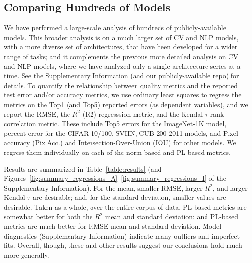 \subsection{Comparing Hundreds of Models}
\label{sxn:all_cv_models}


We have performed a large-scale analysis of hundreds of publicly-available models.
This broader analysis is on a much larger set of CV and NLP models, with a more diverse set of architectures, that have been developed for a wider range of tasks; and it complements the previous more detailed analysis on CV and NLP models, where we have analyzed only a single architecture series at a time.
See the Supplementary Information
(and our publicly-available repo)
for details.
To quantify the relationship between quality metrics and the reported test error and/or accuracy metrics, we use ordinary least squares 
to regress the metrics on the Top1 (and Top5) reported errors (as dependent variables), and we report the RMSE, the $R^2$ (R2) regresssion metric, and the Kendal-$\tau$ rank correlation metric.
These include Top5 errors for the ImageNet-1K model, percent error for the CIFAR-10/100, SVHN, CUB-200-2011 models, and Pixel accuracy (Pix.Acc.) and Intersection-Over-Union (IOU) for other models.
We regress them individually on each of the norm-based and PL-based metrics.




Results are summarized in Table~\ref{table:results} (and Figures~\ref{fig:summary_regressions_A}--\ref{fig:summary_regressions_I} of the Supplementary Information).
For the mean, 
smaller RMSE, 
larger $R^2$, and 
larger Kendal-$\tau$ 
are desirable; 
and, for the standard deviation, smaller values are desirable.
Taken as a whole, over the entire corpus of data, PL-based metrics are somewhat better for both the $R^{2}$ mean and standard deviation;
and PL-based metrics are much better for RMSE mean and standard deviation.
Model diagnostics (Supplementary Information) indicate many outliers and imperfect fits.
Overall, though, these and other results suggest our conclusions hold much more generally.

